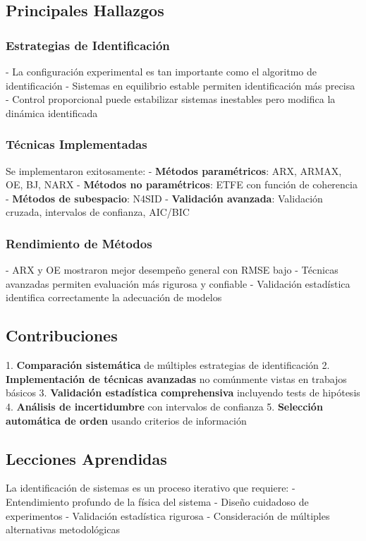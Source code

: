 \documentclass[a4paper,openright,9pt]{report}
\begin{document}
\subsection{Principales Hallazgos}

\subsubsection{Estrategias de Identificación}
- La configuración experimental es tan importante como el algoritmo de identificación
- Sistemas en equilibrio estable permiten identificación más precisa
- Control proporcional puede estabilizar sistemas inestables pero modifica la dinámica identificada

\subsubsection{Técnicas Implementadas}
Se implementaron exitosamente:
- \textbf{Métodos paramétricos}: ARX, ARMAX, OE, BJ, NARX
- \textbf{Métodos no paramétricos}: ETFE con función de coherencia
- \textbf{Métodos de subespacio}: N4SID
- \textbf{Validación avanzada}: Validación cruzada, intervalos de confianza, AIC/BIC

\subsubsection{Rendimiento de Métodos}
- ARX y OE mostraron mejor desempeño general con RMSE bajo
- Técnicas avanzadas permiten evaluación más rigurosa y confiable
- Validación estadística identifica correctamente la adecuación de modelos

\subsection{Contribuciones}

1. \textbf{Comparación sistemática} de múltiples estrategias de identificación
2. \textbf{Implementación de técnicas avanzadas} no comúnmente vistas en trabajos básicos
3. \textbf{Validación estadística comprehensiva} incluyendo tests de hipótesis
4. \textbf{Análisis de incertidumbre} con intervalos de confianza
5. \textbf{Selección automática de orden} usando criterios de información

\subsection{Lecciones Aprendidas}

La identificación de sistemas es un proceso iterativo que requiere:
- Entendimiento profundo de la física del sistema
- Diseño cuidadoso de experimentos
- Validación estadística rigurosa
- Consideración de múltiples alternativas metodológicas
\end{document}
